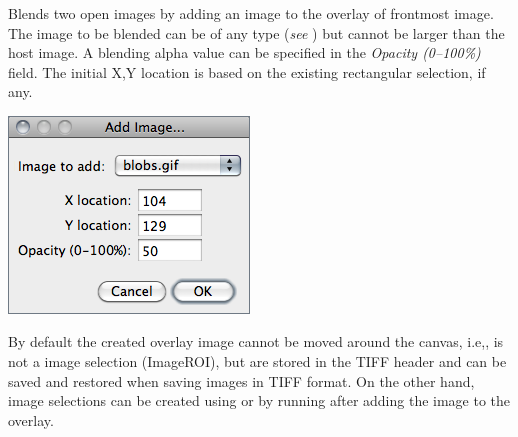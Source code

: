 

\subsubsection[\protect\userinterface{Add Image\ldots{}}]{\protect{}\label{sub:Add-Image...}\change{}}

Blends two open images by adding an image to the overlay
of frontmost image. The image to be blended can be of any type (\emph{see}
) but cannot be larger than the host image.
A blending
alpha value can be specified in the \emph{Opacity (0--100\%)} field.
The initial X,Y location is based on the existing rectangular selection,
if any.

\begin{minipage}[c][1\totalheight][t]{0.35\columnwidth}%
\includegraphics[scale=0.55]{images/AddImage}%
\end{minipage}%
\begin{minipage}[c][1\totalheight][t]{0.65\columnwidth}%
By default the created overlay image cannot be moved around the canvas,
i.e,, is not a image selection (ImageROI), but are stored in the TIFF
header and can be saved and restored when saving images in TIFF format.
On the other hand, image selections can be created using 
or by running 
after adding the image to the overlay.


%
\end{minipage}


